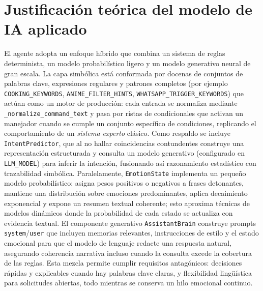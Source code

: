 \documentclass[a4paper,12pt]{article}
\begin{document}
\section{Justificaci\'on te\'orica del modelo de IA aplicado}
El agente adopta un enfoque h\'ibrido que combina un sistema de reglas determinista, un modelo probabil\'istico ligero y un modelo generativo neural de gran escala. La capa simb\'olica est\'a conformada por docenas de conjuntos de palabras clave, expresiones regulares y patrones completos (por ejemplo \texttt{COOKING\_KEYWORDS}, \texttt{ANIME\_FILTER\_HINTS}, \texttt{WHATSAPP\_TRIGGER\_KEYWORDS}) que act\'uan como un motor de producci\'on: cada entrada se normaliza mediante \texttt{\_normalize\_command\_text} y pasa por ristas de condicionales que activan un manejador cuando se cumple un conjunto espec\'ifico de condiciones, replicando el comportamiento de un \emph{sistema experto} cl\'asico. Como respaldo se incluye \texttt{IntentPredictor}, que al no hallar coincidencias contundentes construye una representaci\'on estructurada y consulta un modelo generativo (configurado en \texttt{LLM\_MODEL}) para inferir la intenci\'on, fusionando as\'i razonamiento estad\'istico con trazabilidad simb\'olica. Paralelamente, \texttt{EmotionState} implementa un peque\~no modelo probabil\'istico: asigna pesos positivos o negativos a frases detonantes, mantiene una distribuci\'on sobre emociones predominantes, aplica decaimiento exponencial y expone un resumen textual coherente; esto aproxima t\'ecnicas de modelos din\'amicos donde la probabilidad de cada estado se actualiza con evidencia textual. El componente generativo \texttt{AssistantBrain} construye prompts \texttt{system}/\texttt{user} que incluyen memorias relevantes, instrucciones de estilo y el estado emocional para que el modelo de lenguaje redacte una respuesta natural, asegurando coherencia narrativa incluso cuando la consulta excede la cobertura de las reglas. Esta mezcla permite cumplir requisitos antag\'onicos: decisiones r\'apidas y explicables cuando hay palabras clave claras, y flexibilidad lingü\'istica para solicitudes abiertas, todo mientras se conserva un hilo emocional continuo. 
\end{document}
